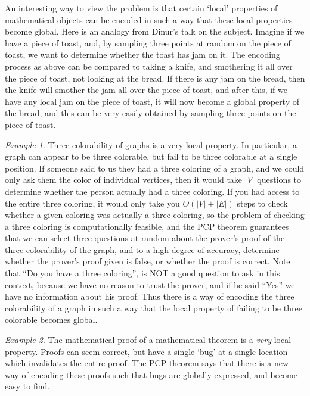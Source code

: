 \documentclass{article}
\theoremstyle{plain}
\theoremstyle{remark}
\newtheorem*{example}{Example}
\theoremstyle{definition}
\begin{document}
\begin{multicols}{2}
An interesting way to view the problem is that certain `local' properties of mathematical objects can be encoded in such a way that these local properties become global. Here is an analogy from Dinur's talk on the subject. Imagine if we have a piece of toast, and, by sampling three points at random on the piece of toast, we want to determine whether the toast has jam on it. The encoding process as above can be compared to taking a knife, and smothering it all over the piece of toast, not looking at the bread. If there is any jam on the bread, then the knife will smother the jam all over the piece of toast, and after this, if we have any local jam on the piece of toast, it will now become a global property of the bread, and this can be very easily obtained by sampling three points on the piece of toast.

\begin{example}
    Three colorability of graphs is a very local property. In particular, a graph can appear to be three colorable, but fail to be three colorable at a single position. If someone said to us they had a three coloring of a graph, and we could only ask them the color of individual vertices, then it would take $|V|$ questions to determine whether the person actually had a three coloring. If you had access to the entire three coloring, it would only take you $O(|V| + |E|)$ steps to check whether a given coloring was actually a three coloring, so the problem of checking a three coloring is computationally feasible, and the PCP theorem guarantees that we can select three questions at random about the prover's proof of the three colorability of the graph, and to a high degree of accuracy, determine whether the prover's proof given is false, or whether the proof is correct. Note that ``Do you have a three coloring'', is NOT a good question to ask in this context, because we have no reason to trust the prover, and if he said ``Yes'' we have no information about his proof. Thus there is a way of encoding the three colorability of a graph in such a way that the local property of failing to be three colorable becomes global.
\end{example}

\begin{example}
    The mathematical proof of a mathematical theorem is a {\it very} local property. Proofs can seem correct, but have a single `bug' at a single location which invalidates the entire proof. The PCP theorem says that there is a new way of encoding these proofs such that bugs are globally expressed, and become easy to find.
\end{example}
\end{multicols}
    
\end{document}
